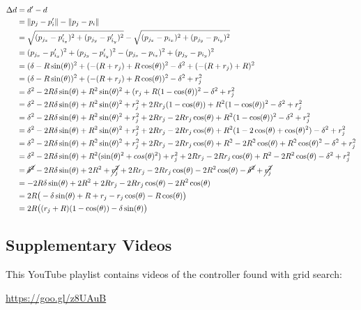 \documentclass[conference]{IEEEtran}
\begin{document}
    \begin{align*}
      \Delta d &= d' - d \\
      &= \lVert p_j - p'_i \rVert - \lVert p_j - p_i \rVert \\
      &=\sqrt{(p_{j_x} - p'_{i_x})^2 + (p_{j_y} - p'_{i_y})^2} - \sqrt{(p_{j_x} - p_{i_x})^2 + (p_{j_y} - p_{i_y})^2} \\
      &=(p_{j_x} - p'_{i_x})^2 + (p_{j_y} - p'_{i_y})^2 - (p_{j_x} - p_{i_x})^2 + (p_{j_y} - p_{i_y})^2 \\
      &= (\delta - R\sin(\theta))^2 + (-(R+r_j) + R\cos(\theta))^2 - \delta^2 + (-(R+r_j) + R)^2 \\
      &= (\delta - R\sin(\theta))^2 + (-(R+r_j) + R\cos(\theta))^2 - \delta^2 + r_j^2 \\
      &= \delta^2 - 2R\delta\sin(\theta) + R^2\sin(\theta)^2 + (r_j + R(1 - \cos(\theta))^2 - \delta^2 + r_j^2 \\
      &= \delta^2 - 2R\delta\sin(\theta) + R^2\sin(\theta)^2 + r_j^2 + 2Rr_j(1 - \cos(\theta)) + R^2(1 - \cos(\theta))^2 - \delta^2 + r_j^2 \\
      &= \delta^2 - 2R\delta\sin(\theta) + R^2\sin(\theta)^2 + r_j^2 + 2Rr_j - 2Rr_j\cos(\theta) + R^2(1 - \cos(\theta))^2 - \delta^2 + r_j^2 \\
      &= \delta^2 - 2R\delta\sin(\theta) + R^2\sin(\theta)^2 + r_j^2 + 2Rr_j - 2Rr_j\cos(\theta) + R^2(1 - 2\cos(\theta) + \cos(\theta)^2) - \delta^2 + r_j^2 \\
      &= \delta^2 - 2R\delta\sin(\theta) + R^2\sin(\theta)^2 + r_j^2 + 2Rr_j - 2Rr_j\cos(\theta) + R^2 - 2R^2\cos(\theta) + R^2\cos(\theta)^2 - \delta^2 + r_j^2 \\
      &= \delta^2 - 2R\delta\sin(\theta) + R^2(\sin(\theta)^2 + cos(\theta)^2) + r_j^2 + 2Rr_j - 2Rr_j\cos(\theta) + R^2 - 2R^2\cos(\theta) - \delta^2 + r_j^2 \\
      &= \cancel{\delta^2} - 2R\delta\sin(\theta) + 2R^2 + \cancel{r_j^2} + 2Rr_j - 2Rr_j\cos(\theta) - 2R^2\cos(\theta) - \cancel{\delta^2} + \cancel{r_j^2} \\
      &= -2R\delta\sin(\theta) + 2R^2 + 2Rr_j - 2Rr_j\cos(\theta) - 2R^2\cos(\theta) \\
      &= 2R\big(-\delta\sin(\theta) + R + r_j - r_j\cos(\theta) - R\cos(\theta)\big) \\
      &= 2R\big((r_j + R)(1 - \cos(\theta))-\delta\sin(\theta)\big)
    \end{align*}

  \subsection{Supplementary Videos} \label{section:videos}

    This YouTube playlist contains videos of the controller found with grid search:

    \href{https://www.youtube.com/playlist?list=PL9HqYJ1IkIKVX9EsT5BY9LnBsBPTjc5bB}{https://goo.gl/z8UAuB}
\end{document}
